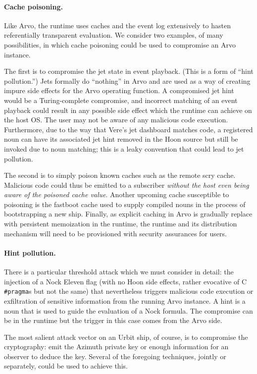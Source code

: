 \documentclass[twoside]{article}
\begin{document}
\paragraph{Cache poisoning.}  Like Arvo, the runtime uses caches and the event log extensively to hasten referentially transparent evaluation.  We consider two examples, of many possibilities, in which cache poisoning could be used to compromise an Arvo instance.

The first is to compromise the jet state in event playback.  (This is a form of ``hint pollution.'')  Jets formally do ``nothing'' in Arvo and are used as a way of creating impure side effects for the Arvo operating function.  A compromised jet hint would be a Turing-complete compromise, and incorrect matching of an event playback could result in any possible side effect which the runtime can achieve on the host OS.  The user may not be aware of any malicious code execution.  Furthermore, due to the way that Vere's jet dashboard matches code, a registered noun can have its associated jet hint removed in the Hoon source but still be invoked due to noun matching; this is a leaky convention that could lead to jet pollution.

The second is to simply poison known caches such as the remote scry cache.  Malicious code could thus be emitted to a subscriber \emph{without the host even being aware of the poisoned cache value}.  Another upcoming cache susceptible to poisoning is the fastboot cache used to supply compiled nouns in the process of bootstrapping a new ship.  Finally, as explicit caching in Arvo is gradually replace with persistent memoization in the runtime, the runtime and its distribution mechanism will need to be provisioned with security assurances for users.

\paragraph{Hint pollution.}  There is a particular threshold attack which we must consider in detail:  the injection of a Nock Eleven flag (with no Hoon side effects, rather evocative of C \texttt{\#pragma}s but not the same) that nevertheless triggers malicious code execution or exfiltration of sensitive information from the running Arvo instance.  A hint is a noun that is used to guide the evaluation of a Nock formula.  The compromise can be in the runtime but the trigger in this case comes from the Arvo side.

The most salient attack vector on an Urbit ship, of course, is to compromise the cryptography:  emit the Azimuth private key or enough information for an observer to deduce the key.  Several of the foregoing techniques, jointly or separately, could be used to achieve this.
\end{document}
